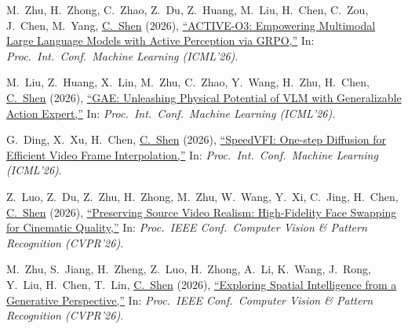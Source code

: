 \documentclass[9pt, a4paper]{article}
\newcommand{\years}[1]{\marginnote{\scriptsize #1}}
\def\highlight{\uline}
\begin{document}
\years{2026} \noindent M.~Zhu, H.~Zhong, C.~Zhao, Z.~Du, Z.~Huang, M.~Liu, H.~Chen, C.~Zou, J.~Chen, M.~Yang, \highlight{C.~Shen} (2026),
\href{http://www.google.com/search?lr=&ie=UTF-8&oe=UTF-8&q=ACTIVE-O3%3A+Empowering+Multimodal+Large+Language+Models+with+Active+Perception+via+GRPO+Muzhi+Zhu%2C+Hao+Zhong%2C+Canyu+Zhao%2C+Zongze+Du%2C+Zheng+Huang%2C+Mingyu+Liu%2C+Hao+Chen%2C+Cheng+Zou%2C+Jingdong+Chen%2C+Ming+Yang%2C+Chunhua+Shen}{``{ACTIVE-O3}: Empowering Multimodal Large Language Models with Active Perception via {GRPO},{}''}
In: \emph{Proc.\ Int.\ Conf.\  Machine Learning (ICML'26)}.

\medskip

\years{2026} M.~Liu, Z.~Huang, X.~Lin, M.~Zhu, C.~Zhao, Y.~Wang, H.~Zhu, H.~Chen, \highlight{C.~Shen} (2026),
\href{http://www.google.com/search?lr=&ie=UTF-8&oe=UTF-8&q=GAE%3A+Unleashing+Physical+Potential+of+VLM+with+Generalizable+Action+Expert+Mingyu+Liu%2C+Zheng+Huang%2C+Xiaoyi+Lin%2C+Muzhi+Zhu%2C+Canyu+Zhao%2C+Yating+Wang%2C+Haoyi+Zhu%2C+Hao+Chen%2C+Chunhua+Shen}{``{GAE}: Unleashing Physical Potential of {VLM} with Generalizable Action Expert,{}''}
In: \emph{Proc.\ Int.\ Conf.\  Machine Learning (ICML'26)}.

\medskip

\years{2026} G.~Ding, X.~Xu, H.~Chen, \highlight{C.~Shen} (2026),
\href{http://www.google.com/search?lr=&ie=UTF-8&oe=UTF-8&q=SpeedVFI%3A+One-step+Diffusion+for+Efficient+Video+Frame+Interpolation+Ganggui+Ding%2C+Xiaogang+Xu%2C+Hao+Chen%2C+Chunhua+Shen}{``{SpeedVFI}: One-step Diffusion for Efficient Video Frame Interpolation,{}''}
In: \emph{Proc.\ Int.\ Conf.\  Machine Learning (ICML'26)}.

\medskip

\years{2026} Z.~Luo, Z.~Du, Z.~Zhu, H.~Zhong, M.~Zhu, W.~Wang, Y.~Xi, C.~Jing, H.~Chen, \highlight{C.~Shen} (2026),
\href{http://www.google.com/search?lr=&ie=UTF-8&oe=UTF-8&q=Preserving+Source+Video+Realism%3A+High-Fidelity+Face+Swapping+for+Cinematic+Quality+Zekai+Luo%2C+Zongze+Du%2C+Zhouhang+Zhu%2C+Hao+Zhong%2C+Muzhi+Zhu%2C+Wen+Wang%2C+Yuling+Xi%2C+Chenchen+Jing%2C+Hao+Chen%2C+Chunhua+Shen}{``Preserving Source Video Realism: High-Fidelity Face Swapping for Cinematic Quality,{}''}
In: \emph{Proc.\ IEEE Conf.\  Computer Vision \& Pattern Recognition (CVPR'26)}.

\medskip

\years{2026} M.~Zhu, S.~Jiang, H.~Zheng, Z.~Luo, H.~Zhong, A.~Li, K.~Wang, J.~Rong, Y.~Liu, H.~Chen, T.~Lin, \highlight{C.~Shen} (2026),
\href{http://www.google.com/search?lr=&ie=UTF-8&oe=UTF-8&q=Exploring+Spatial+Intelligence+from+a+Generative+Perspective+Muzhi+Zhu%2C+Shunyao+Jiang%2C+Huanyi+Zheng%2C+Zekai+Luo%2C+Hao+Zhong%2C+Anzhou+Li%2C+Kaijun+Wang%2C+Jintao+Rong%2C+Yang+Liu%2C+Hao+Chen%2C+Tao+Lin%2C+Chunhua+Shen}{``Exploring Spatial Intelligence from a Generative Perspective,{}''}
In: \emph{Proc.\ IEEE Conf.\  Computer Vision \& Pattern Recognition (CVPR'26)}.
\end{document}
